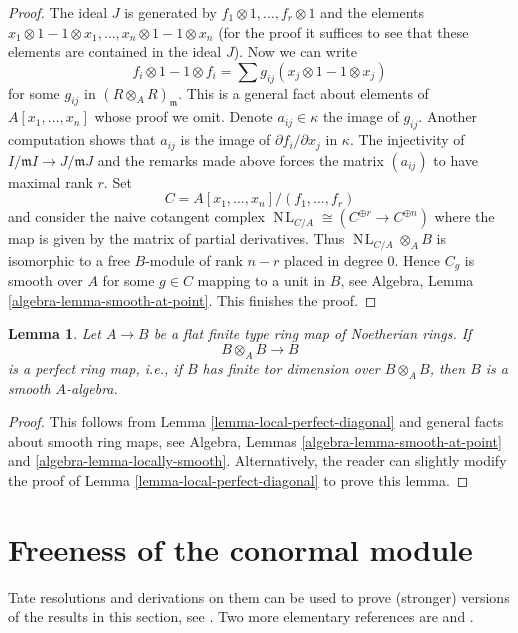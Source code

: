 \documentclass{stacks-project}
\theoremstyle{plain}
\newtheorem{lemma}[subsection]{Lemma}
\theoremstyle{definition}
\theoremstyle{remark}
\numberwithin{equation}{subsection}
\def\NL{\mathop{N\!L}\nolimits}
\begin{document}
\begin{proof}
\medskip\noindent
The ideal $J$ is generated by $f_1 \otimes 1, \ldots, f_r \otimes 1$
and the elements $x_1 \otimes 1 - 1 \otimes x_1, \ldots,
x_n \otimes 1 - 1 \otimes x_n$ (for the proof it suffices to
see that these elements are contained in the ideal $J$).
Now we can write
$$
f_i \otimes 1 - 1 \otimes f_i =
\sum g_{ij} (x_j \otimes 1 - 1 \otimes x_j)
$$
for some $g_{ij}$ in $(R \otimes_A R)_\mathfrak m$. This is a general
fact about elements of $A[x_1, \ldots, x_n]$ whose proof we omit.
Denote $a_{ij} \in \kappa$ the image of $g_{ij}$. Another computation
shows that $a_{ij}$ is the image of $\partial f_i / \partial x_j$ in $\kappa$.
The injectivity of $I/\mathfrak m I \to J/\mathfrak m J$ and the remarks
made above forces the matrix $(a_{ij})$ to have maximal rank $r$.
Set
$$
C = A[x_1, \ldots, x_n]/(f_1, \ldots, f_r)
$$
and consider the naive cotangent complex
$\NL_{C/A} \cong (C^{\oplus r} \to C^{\oplus n})$
where the map is given by the matrix of partial derivatives.
Thus $\NL_{C/A} \otimes_A B$
is isomorphic to a free $B$-module of rank $n - r$ placed in degree $0$.
Hence $C_g$ is smooth over $A$ for some $g \in C$ mapping to a unit
in $B$, see Algebra, Lemma \ref{algebra-lemma-smooth-at-point}.
This finishes the proof.
\end{proof}

\begin{lemma}
\label{lemma-perfect-diagonal}
Let $A \to B$ be a flat finite type ring map of Noetherian rings. If
$$
B \otimes_A B \longrightarrow B
$$
is a perfect ring map, i.e., if $B$ has finite tor dimension over
$B \otimes_A B$, then $B$ is a smooth $A$-algebra.
\end{lemma}

\begin{proof}
This follows from Lemma \ref{lemma-local-perfect-diagonal}
and general facts about smooth ring maps, see
Algebra, Lemmas \ref{algebra-lemma-smooth-at-point} and
\ref{algebra-lemma-locally-smooth}.
Alternatively, the reader can slightly modify the proof of
Lemma \ref{lemma-local-perfect-diagonal} to prove
this lemma.
\end{proof}






\section{Freeness of the conormal module}
\label{section-freeness-conormal}

\noindent
Tate resolutions and derivations on them can be used to prove
(stronger) versions of the results in this section, see \cite{Iyengar}.
Two more elementary references are
\cite{Vasconcelos} and \cite{Ferrand-lci}.
\end{document}
